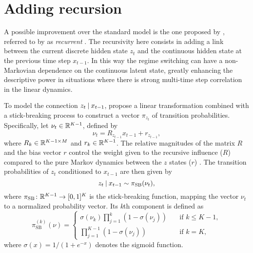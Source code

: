 \documentclass[
  10pt, twocolumn, headings=normal,
  footlines=1, DIV=calc
]{scrartcl}
\begin{document}
\section{Adding recursion}
A possible improvement over the standard  model is the one proposed
by \textcite{Barber06}, referred to by \textcite{Linderman17} as
\emph{recurrent} . The recursivity here consists in adding a link
between the current discrete hidden state $z_{t}$ and the continuous hidden
state at the previous time step $x_{t-1}$. In this way the regime switching can
have a non-Markovian dependence on the continuous latent state, greatly
enhancing the descriptive power in situations where there is strong multi-time
step correlation in the linear dynamics.

To model the connection $z_{t} \:\vert\: x_{t-1}$, \textcite{Linderman17} propose a
linear transformation combined with a stick-breaking process to construct a
vector $\pi_{z_{t}}$ of transition probabilities. Specifically, let $\nu_{t} \in
\mathbb{R}^{K-1}$, defined by
\begin{equation}
  \nu_{t} = R_{z_{t-1}} x_{t-1} + r_{z_{t-1}},
\end{equation}
where $R_{k} \in \mathbb{R}^{K-1 \times M}$ and $r_{k} \in \mathbb{R}^{K-1}$. The relative
magnitudes of the matrix $R$ and the bias vector $r$ control the weight given to
the recursive influence ($R$) compared to the pure Markov dynamics between the
$z$ states ($r$) \autocite{Linderman17}. The transition probabilities of $z_{t}$
conditioned to $x_{t-1}$ are then given by
\begin{equation}
  z_{t} \:\vert\: x_{t-1} \sim \pi_{\mathrm{SB}}(\nu_{t}),
  \label{eq:nu-xtm1}
\end{equation}
where $\pi_{\mathrm{SB}} \colon \mathbb{R}^{K-1} \to [0,1]^{K}$ is the stick-breaking
function, mapping the vector $\nu_{t}$ to a normalized probability vector. Its
\emph{k}th component is defined as
\begin{equation}
  \pi_{\mathrm{SB}}^{(k)}(\nu) =
  \begin{cases}
    \sigma(\nu_{k}) \prod_{j = 1}^{k} (1 - \sigma(\nu_{j}))
    \quad &\text{if } k \leq K - 1, \\
    \prod_{j = 1}^{K - 1} (1 - \sigma(\nu_{j})) \quad &\text{if } k = K,
  \end{cases}
\end{equation}
where $\sigma(x) = 1 / (1 + e^{-x})$ denotes the sigmoid function.
\end{document}
